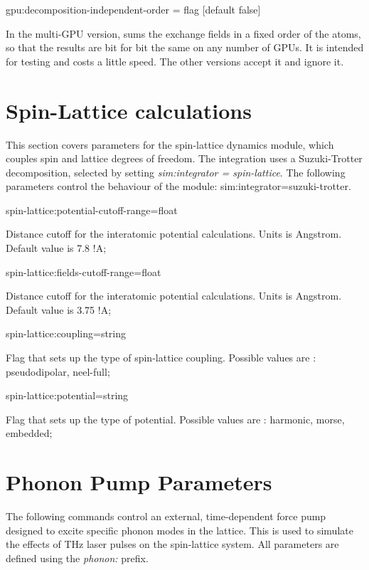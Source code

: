 {\zicf gpu:decomposition-independent-order = flag [default false]} In the multi-GPU version, sums the exchange fields in a fixed order of the atoms, so that the results are bit for bit the same on any number of GPUs. It is intended for testing and costs a little speed. The other versions accept it and ignore it.

\section*{Spin-Lattice calculations}
This section covers parameters for the spin-lattice dynamics module, which couples spin and lattice degrees of freedom. The integration uses a Suzuki-Trotter decomposition, selected by setting \textit{sim:integrator = spin-lattice}. The following parameters control the behaviour of the module:
sim:integrator=suzuki-trotter.

{\zicf spin-lattice:potential-cutoff-range=float}
Distance cutoff for the interatomic potential calculations. Units is Angstrom.  Default value is 7.8 !A;

{\zicf spin-lattice:fields-cutoff-range=float}
Distance cutoff for the interatomic potential calculations. Units is Angstrom.  Default value is 3.75 !A;

{\zicf spin-lattice:coupling=string}
 Flag that sets up the type of spin-lattice coupling. Possible values are : pseudodipolar, {neel-full};

 {\zicf spin-lattice:potential=string}
 Flag that sets up the type of potential. Possible values are : harmonic, morse, embedded;


\section*{Phonon Pump Parameters}
The following commands control an external, time-dependent force pump designed to excite specific phonon modes in the lattice. This is used to simulate the effects of THz laser pulses on the spin-lattice system. All parameters are defined using the \textit{phonon:} prefix.

